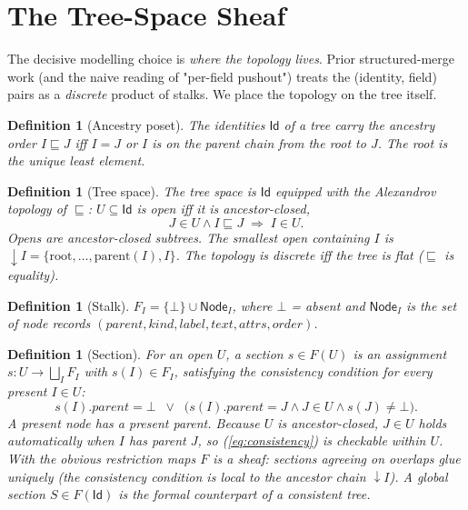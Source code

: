 \documentclass[11pt,a4paper]{article}
\newtheorem{definition}[theorem]{Definition}
\newcommand{\Id}{\mathsf{Id}}
\newcommand{\Node}{\mathsf{Node}}
\begin{document}
\section{The Tree-Space Sheaf}
\label{sec:model}

The decisive modelling choice is \emph{where the topology lives}. Prior
structured-merge work (and the naive reading of "per-field pushout") treats
the (identity, field) pairs as a \emph{discrete} product of stalks. We place
the topology on the tree itself.

\begin{definition}[Ancestry poset]
The identities $\Id$ of a tree carry the ancestry order $I \sqsubseteq J$
iff $I = J$ or $I$ is on the parent chain from the root to $J$. The root
is the unique least element.
\end{definition}

\begin{definition}[Tree space]
The \emph{tree space} is $\Id$ equipped with the Alexandrov topology of
$\sqsubseteq$: $U \subseteq \Id$ is open iff it is ancestor-closed,
\[
J \in U \wedge I \sqsubseteq J \;\Longrightarrow\; I \in U.
\]
Opens are ancestor-closed subtrees. The smallest open containing $I$ is
$\downarrow I = \{\text{root},\dots,\text{parent}(I), I\}$. The topology is
discrete iff the tree is flat ($\sqsubseteq$ is equality).
\end{definition}

\begin{definition}[Stalk]
$F_I = \{\bot\} \cup \Node_I$, where $\bot$ = absent and $\Node_I$ is the
set of node records $(parent, kind, label, text, attrs, order)$.
\end{definition}

\begin{definition}[Section]
For an open $U$, a \emph{section} $s \in F(U)$ is an assignment
$s : U \to \bigsqcup_I F_I$ with $s(I) \in F_I$, satisfying the
\emph{consistency condition} for every present $I \in U$:
\begin{equation}
\tag{C}
s(I).parent = \bot \;\;\vee\;\; \bigl(s(I).parent = J \wedge J \in U \wedge s(J) \neq \bot\bigr).
\label{eq:consistency}
\end{equation}
A present node has a present parent. Because $U$ is ancestor-closed,
$J \in U$ holds automatically when $I$ has parent $J$, so (\ref{eq:consistency})
is checkable within $U$. With the obvious restriction maps $F$ is a sheaf:
sections agreeing on overlaps glue uniquely (the consistency condition is
local to the ancestor chain $\downarrow I$). A \emph{global section}
$S \in F(\Id)$ is the formal counterpart of a consistent tree.
\end{definition}
\end{document}
